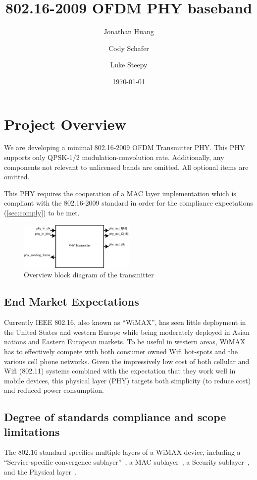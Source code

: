 \documentclass[dvips,10pt,twocolumn]{article}
\title{802.16-2009 OFDM PHY baseband}
\author{Jonathan Huang \and Cody Schafer \and Luke Steepy}
\date{\today}
\begin{document}
\maketitle

\section{Project Overview}
We are developing a minimal 802.16-2009 OFDM Transmitter PHY.  This PHY
supports only QPSK-1/2 modulation-convolution rate. Additionally, any
components not relevant to unlicensed bands are omitted.  All optional items
are omitted.

This PHY requires the cooperation of a MAC layer implementation which is
compliant with the 802.16-2009 standard in order for the compliance
expectations (\autoref{sec:comply}) to be met.

\begin{figure}
\includegraphics[width=0.5\textwidth]{t_block.eps}
\caption{Overview block diagram of the transmitter}
\end{figure}


	\subsection{End Market Expectations}
	Currently IEEE 802.16, also known as ``WiMAX'', has seen little
	deployment in the United States and western Europe while being
	moderately deployed in Asian nations and Eastern European markets.
	To be useful in western areas, WiMAX has to effectively compete
	with both consumer owned Wifi hot-spots and the various cell phone
	networks. Given the impressively low cost of both cellular and Wifi
	(802.11) systems combined with the expectation that they work well
	in mobile devices, this physical layer (PHY) targets both
	simplicity (to reduce cost) and reduced power consumption.

	\subsection{Degree of standards compliance and scope limitations}
	\label{sec:comply}
	The 802.16 standard specifies multiple layers of a WiMAX device,
	including a ``Service-specific convergence
	sublayer''~\cite[section 5]{IEEE:802.16}, a MAC
	sublayer~\cite[section 6]{IEEE:802.16}, a Security
	sublayer~\cite[section 7]{IEEE:802.16}, and the Physical
	layer~\cite[section 8]{IEEE:802.16}. 
	
\end{document}
